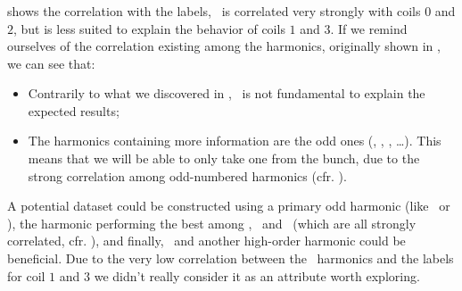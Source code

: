 \subsubsection{\an}
 shows the correlation with the labels, \an\ is correlated very strongly with
coils $0$ and $2$, but is less suited to explain the behavior of coils $1$ and $3$. If we remind
ourselves of the correlation existing among the harmonics, originally shown in , we can see that:
\begin{itemize}
	\item Contrarily to what we discovered in , \an[2]\ is not
	      fundamental to explain the expected results;
	\item The harmonics containing more information are the odd ones (\an[1], \an[3], \an[5],
	      \ldots). This means that we will be able to only take one from the bunch, due to the
	      strong correlation among odd-numbered harmonics (cfr. ).
\end{itemize}
A potential dataset could be constructed using a primary odd harmonic (like \an[1]\ or \an[3]), the
harmonic performing the best among \an[4], \an[8]\ and \an[12]\ (which are all strongly correlated,
cfr. ), and finally, \an[2]\ and another high-order harmonic could be beneficial. Due to
the very low correlation between the \an\ harmonics and the labels for coil $1$ and $3$ we didn't really
consider it as an attribute worth exploring.
